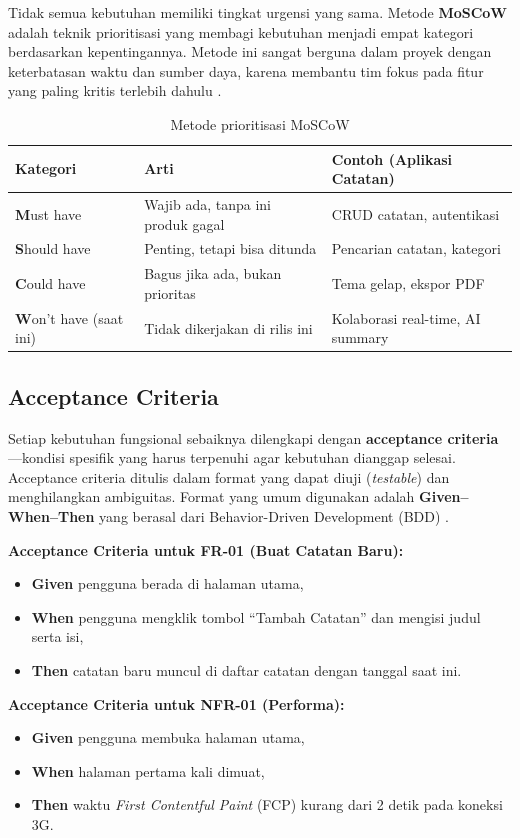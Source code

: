 Tidak semua kebutuhan memiliki tingkat urgensi yang sama. Metode \textbf{MoSCoW} adalah teknik prioritisasi yang membagi kebutuhan menjadi empat kategori berdasarkan kepentingannya. Metode ini sangat berguna dalam proyek dengan keterbatasan waktu dan sumber daya, karena membantu tim fokus pada fitur yang paling kritis terlebih dahulu \cite{webdevLearn}.

\begin{table}[H]
\centering
\begin{tabular}{|P{3cm}|P{4cm}|P{5cm}|}
\hline
\textbf{Kategori} & \textbf{Arti} & \textbf{Contoh (Aplikasi Catatan)} \\
\hline
\textbf{M}ust have & Wajib ada, tanpa ini produk gagal & CRUD catatan, autentikasi \\
\hline
\textbf{S}hould have & Penting, tetapi bisa ditunda & Pencarian catatan, kategori \\
\hline
\textbf{C}ould have & Bagus jika ada, bukan prioritas & Tema gelap, ekspor PDF \\
\hline
\textbf{W}on't have (saat ini) & Tidak dikerjakan di rilis ini & Kolaborasi real-time, AI summary \\
\hline
\end{tabular}
\caption{Metode prioritisasi MoSCoW}
\end{table}

\subsection{Acceptance Criteria}

Setiap kebutuhan fungsional sebaiknya dilengkapi dengan \textbf{acceptance criteria}---kondisi spesifik yang harus terpenuhi agar kebutuhan dianggap selesai. Acceptance criteria ditulis dalam format yang dapat diuji (\textit{testable}) dan menghilangkan ambiguitas. Format yang umum digunakan adalah \textbf{Given--When--Then} yang berasal dari Behavior-Driven Development (BDD) \cite{mdnLearn}.

\begin{contoh}
\textbf{Acceptance Criteria untuk FR-01 (Buat Catatan Baru):}
\begin{itemize}
  \item \textbf{Given} pengguna berada di halaman utama,
  \item \textbf{When} pengguna mengklik tombol ``Tambah Catatan'' dan mengisi judul serta isi,
  \item \textbf{Then} catatan baru muncul di daftar catatan dengan tanggal saat ini.
\end{itemize}

\textbf{Acceptance Criteria untuk NFR-01 (Performa):}
\begin{itemize}
  \item \textbf{Given} pengguna membuka halaman utama,
  \item \textbf{When} halaman pertama kali dimuat,
  \item \textbf{Then} waktu \textit{First Contentful Paint} (FCP) kurang dari 2 detik pada koneksi 3G.
\end{itemize}
\end{contoh}

